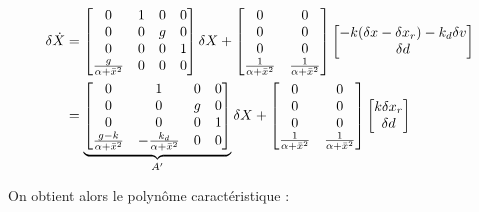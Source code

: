 \documentclass[10pt]{article}
\begin{document}
\begin{align}
\delta \dot X &=
	\begin{bmatrix}
		0 & 1 & 0 & 0 \\
		0 & 0 & g & 0 \\
		0 & 0 & 0 & 1 \\
		\frac{g}{\alpha + \bar x^2} & 0 & 0 & 0
	\end{bmatrix}
	\delta X
	+
	\begin{bmatrix}
		0 & 0 \\
		0 & 0 \\
		0 & 0 \\
		\frac{1}{\alpha + \bar x^2} & \frac{1}{\alpha + \bar x^2}
	\end{bmatrix}
	\begin{bmatrix}
		- k ( \delta x - \delta x_r ) - k_d \delta v \\ \delta d
	\end{bmatrix}
	\notag \\
	&= \underbrace{
	\begin{bmatrix}
		0 & 1 & 0 & 0 \\
		0 & 0 & g & 0 \\
		0 & 0 & 0 & 1 \\
		\frac{g - k}{\alpha + \bar x^2} & - \frac{k_d}{\alpha + \bar x^2} & 0 & 0
	\end{bmatrix}
	}_{A'}
	\delta X
	+
	\begin{bmatrix}
		0 & 0 \\
		0 & 0 \\
		0 & 0 \\
		\frac{1}{\alpha + \bar x^2} & \frac{1}{\alpha + \bar x^2}
	\end{bmatrix}
	\begin{bmatrix}
		k \delta x_r \\ \delta d
	\end{bmatrix}
	\notag
\end{align}

\noindent On obtient alors le polynôme caractéristique :
\end{document}
